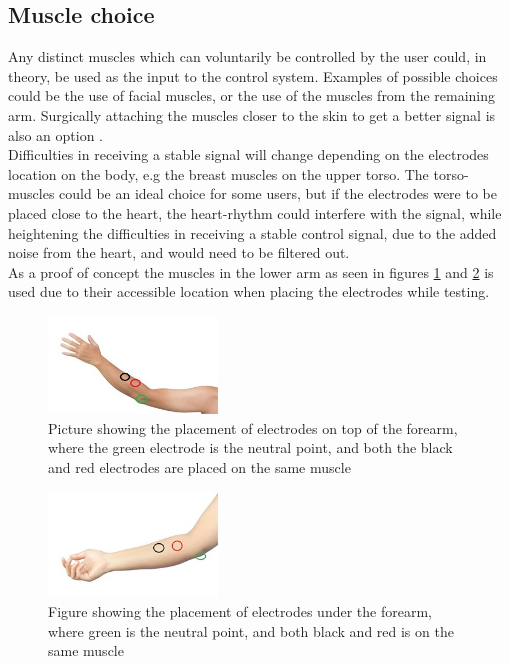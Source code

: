 \subsection*{Muscle choice}
 Any distinct muscles which can voluntarily be controlled by the user could, in theory, be used as the input to the control system. Examples of possible choices could be the use of facial muscles, or the use of the muscles from the remaining arm. Surgically attaching the muscles closer to the skin to get a better signal is also an option \cite{SimonsSu49:online}.\\
 Difficulties in receiving a stable signal will change depending on the electrodes location on the body, e.g the breast muscles on the upper torso. The torso-muscles could be an ideal choice for some users, but if the electrodes were to be placed close to the heart, the heart-rhythm could interfere with the signal, while heightening the difficulties in receiving a stable control signal, due to the added noise from the heart, and would need to be filtered out. \\
 As a proof of concept the muscles in the lower arm as seen in figures \ref{ref:UpperArm} and \ref{fig:UnderArm} is used due to their accessible location when placing the electrodes while testing.
\begin{multicols}{2}
\begin{figure}[H]
    \centering
    \includegraphics[width=0.4\textwidth]{Figures/Technical_figures/OverArm.jpg}
    \caption{Picture showing the placement of electrodes on top of the forearm, where the green electrode is the neutral point, and both the black and red electrodes are placed on the same muscle}
    \label{ref:UpperArm}
\end{figure}
\columnbreak
\begin{figure}[H]
    \centering
    \includegraphics[width=0.4\textwidth]{Figures/Technical_figures/UnderArm.jpg}
    \caption{Figure showing the placement of electrodes under the forearm, where green is the neutral point, and both black and red is on the same muscle}
    \label{fig:UnderArm}
\end{figure} 
\end{multicols}